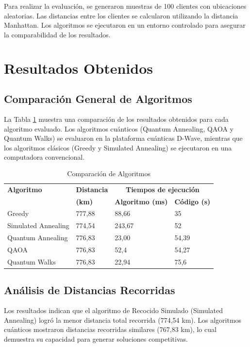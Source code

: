 \documentclass[11pt,a4paper,spanish]{book}
\begin{document}
Para realizar la evaluación, se generaron muestras de 100 clientes con ubicaciones aleatorias. Las distancias entre los clientes se calcularon utilizando la distancia Manhattan. Los algoritmos se ejecutaron en un entorno controlado para asegurar la comparabilidad de los resultados.

\section{Resultados Obtenidos}

\subsection{Comparación General de Algoritmos}

La Tabla \ref{tab:comparison} muestra una comparación de los resultados obtenidos para cada algoritmo evaluado. Los algoritmos cuánticos (Quantum Annealing, QAOA y Quantum Walks) se evaluaron en la plataforma cuánticas D-Wave, mientras que los algoritmos clásicos (Greedy y Simulated Annealing) se ejecutaron en una computadora convencional.

\begin{table}[H]
\centering
\begin{tabular}{|m{5cm}|m{3cm}|m{3cm}|m{3cm}|}
\hline
\textbf{Algoritmo} & \textbf{Distancia} & \multicolumn{2}{c|}{\textbf{Tiempos de ejecución}} \\ \cline{3-4}
& \textbf{(km)} & \textbf{Algoritmo (ms)} & \textbf{Código (s)} \\ \hline
Greedy & 777,88 & 88,66 & 35 \\ \hline
Simulated Annealing & 774,54 & 243,67 & 52 \\ \hline
Quantum Annealing & 776,83 & 23,00 & 54,39 \\ \hline
QAOA & 776,83 & 52,4 & 54,27 \\ \hline
Quantum Walks & 776,83 & 22,94 & 75,6 \\ \hline
\end{tabular}
\caption{Comparación de Algoritmos}
\label{tab:comparison}
\end{table}

\subsection{Análisis de Distancias Recorridas}

Los resultados indican que el algoritmo de Recocido Simulado (Simulated Annealing) logró la menor distancia total recorrida (774,54 km). Los algoritmos cuánticos mostraron distancias recorridas similares (767,83 km), lo cual demuestra su capacidad para generar soluciones competitivas.
\end{document}
